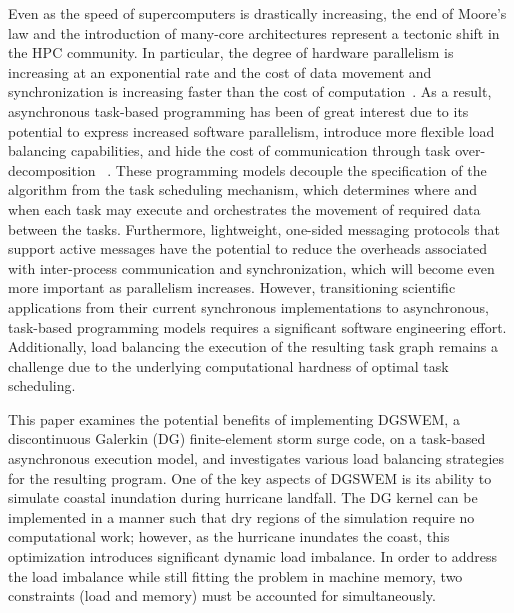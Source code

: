 Even as the speed of supercomputers is drastically increasing, the end of Moore's law and the introduction of many-core architectures represent a tectonic shift in the HPC community.
In particular, the degree of hardware parallelism is increasing at an exponential rate and the cost of data movement and synchronization is increasing faster than the cost of computation~\cite{Kogge2013}.
As a result, asynchronous task-based programming has been of great interest due to its potential to express increased software parallelism, introduce more flexible load balancing capabilities, and hide the cost of communication through task over-decomposition ~\cite{charm++,hpx2,legion,ocr,parsec,starpu,uintah,darma}.
These programming models decouple the specification of the algorithm from the task scheduling mechanism, which determines where and when each task may execute and orchestrates the movement of required data between the tasks.
Furthermore, lightweight, one-sided messaging protocols that support active messages have the potential to reduce the overheads associated with inter-process communication and synchronization, which will become even more important as parallelism increases.
However, transitioning scientific applications from their current synchronous implementations to asynchronous, task-based programming models requires a significant software engineering effort.
Additionally, load balancing the execution of the resulting task graph remains a challenge due to the underlying computational hardness of optimal task scheduling.

This paper examines the potential benefits of implementing DGSWEM, a discontinuous Galerkin (DG) finite-element storm surge code, on a task-based asynchronous execution model, and investigates various load balancing strategies for the resulting program.
One of the key aspects of DGSWEM is its ability to simulate coastal inundation during hurricane landfall.
The DG kernel can be implemented in a manner such that dry regions of the simulation require no computational work; however, as the hurricane inundates the coast, this optimization introduces significant dynamic load imbalance.
In order to address the load imbalance while still fitting the problem in machine memory, two constraints (load and memory) must be accounted for simultaneously.

